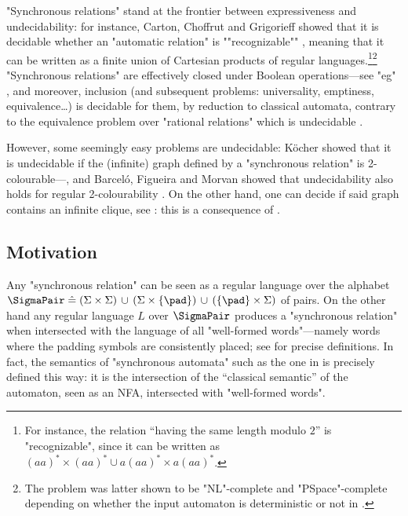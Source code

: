 "Synchronous relations" stand at the frontier between expressiveness and undecidability: for instance, Carton, Choffrut and Grigorieff showed that it is decidable whether an "automatic relation" is ""recognizable"" \cite[Proposition 3.9, p.~265]{carton_decision_2006}, meaning that
it can be written as a finite union of Cartesian products of regular languages.\footnote{For 
instance, the relation ``having the same length modulo $2$'' is "recognizable", since it can be 
written as $(aa)^*\times (aa)^* \cup
a(aa)^*\times a(aa)^*$.}\footnote{The problem was latter shown to be "NL"-complete and
"PSpace"-complete depending on whether the input automaton is deterministic or not
in \cite[Theorem 1, p.~3]{barcelo_monadic_2019}.}
"Synchronous relations" are effectively closed under Boolean operations---see "eg" \cite[Lemma XI.1.3, p.~627]{blumensath_monadic_2023},
and moreover, inclusion (and subsequent problems: universality, emptiness, equivalence…) is decidable for them,
by reduction to classical automata,
contrary to the equivalence problem over "rational relations"
which is undecidable \cite[Theorem 8.4, p.~81]{berstel_transductions_1979}.

However, some seemingly easy problems are undecidable: Köcher showed that
it is undecidable if the (infinite) graph defined by a "synchronous relation" is
2-colourable---\cite[Proposition 6.5, p.~43]{kocher_analyse_2014}, and Barceló, Figueira and Morvan showed that undecidability also
holds for regular 2-colourability \cite[Theorem 4.4, p.~8]{barcelo_separating_2023}.
On the other hand, one can decide
if said graph contains an infinite clique, see \cite[Corollary 5.5, p.~32]{kuske_natural_2010}:
this is a consequence of \cite[Theorem 3.20, p.~185]{Rubin_2008}. 

\subsection{Motivation}

Any "synchronous relation" can be seen as a regular language over the alphabet
$\SigmaPair \defeq (\Sigma \times \Sigma) \,\cup\,
(\Sigma \times \{\pad\}) \,\cup\, (\{\pad\} \times \Sigma)$ of pairs. On the other hand any regular language $L$ over $\SigmaPair$
produces a "synchronous relation" when intersected with the language of all
"well-formed words"---namely words where the padding symbols are consistently placed;
see  for precise definitions. In fact, the semantics
of "synchronous automata" such as the one in  is precisely defined this way:
it is the intersection of the ``classical semantic'' of the automaton, seen as an NFA, intersected
with "well-formed words".

